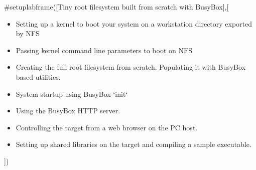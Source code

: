 #setuplabframe([Tiny root filesystem built from scratch with BusyBox],[
  \begin{itemize}
  \item Setting up a kernel to boot your system on a workstation
    directory exported by NFS
  \item Passing kernel command line parameters to boot on NFS
  \item Creating the full root filesystem from scratch.
    Populating it with BusyBox based utilities.
  \item System startup using BusyBox `init`
  \item Using the BusyBox HTTP server.
  \item Controlling the target from a web browser on the PC host.
  \item Setting up shared libraries on the target and compiling
    a sample executable.
  \end{itemize}
])
